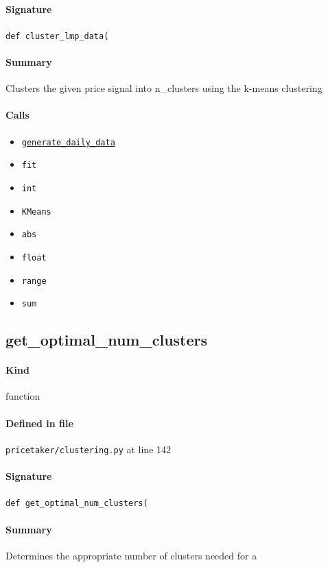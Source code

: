 \documentclass[11pt]{report}
\begin{document}
\paragraph{Signature} \texttt{def cluster\_lmp\_data(}
\paragraph{Summary} Clusters the given price signal into n\_clusters using the k-means clustering
\paragraph{Calls}
\begin{itemize}[leftmargin=*]
  \item \hyperref[def:pricetaker-clustering.py:generate_daily_data:L35]{\texttt{generate\_daily\_data}}
  \item \texttt{fit}
  \item \texttt{int}
  \item \texttt{KMeans}
  \item \texttt{abs}
  \item \texttt{float}
  \item \texttt{range}
  \item \texttt{sum}
\end{itemize}
\subsection{get\_optimal\_num\_clusters}
\label{def:pricetaker-clustering.py:get_optimal_num_clusters:L142}
\paragraph{Kind} function
\paragraph{Defined in file} \texttt{pricetaker/clustering.py} at line 142
\paragraph{Signature} \texttt{def get\_optimal\_num\_clusters(}
\paragraph{Summary} Determines the appropriate number of clusters needed for a
\end{document}
